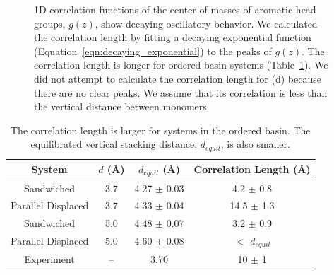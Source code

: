 \documentclass[journal=jpcbfk,manuscript=article]{achemso}
\begin{document}
\begin{figure}[!htb]
  \caption{1D correlation functions of the center of masses of aromatic head
	  groups, $g(z)$, show decaying oscillatory behavior. We calculated the
	  correlation length by fitting a decaying exponential function
	  (Equation~\ref{eqn:decaying_exponential}) to the peaks of $g(z)$. The
	  correlation length is longer for ordered basin systems
	  (Table~\ref{table:correlation_length}). We did not attempt to calculate the
	  correlation length for (d) because there are no clear peaks. We assume that its
	  correlation is less than the vertical distance between monomers.}\label{fig:correlation}
  \end{figure}  
  
  \begin{table}[h]
  \centering
  \begin{tabular}{cccc}
  \toprule
  System             & $\mathit{d}$ (\AA) & $\mathit{d}_{equil}$ (\AA) & Correlation Length (\AA) \\
  \midrule
  Sandwiched         & 3.7                &    4.27 $\pm$ 0.03         & 4.2 $\pm$ 0.8            \\
  Parallel Displaced & 3.7                &    4.33 $\pm$ 0.04         & 14.5 $\pm$ 1.3           \\ 
  Sandwiched         & 5.0                &    4.48 $\pm$ 0.07         & 3.2 $\pm$ 0.9            \\
  Parallel Displaced & 5.0                &    4.60 $\pm$ 0.08         & $<$ $d_{equil}$ \\ 
  Experiment         & --                 &    3.70                    & 10 $\pm$ 1               \\
  \bottomrule
  \end{tabular}
  \caption{The correlation length is larger for systems in the ordered basin. The equilibrated vertical
  stacking distance, $\mathit{d}_{equil}$, is also smaller.}
  \label{table:correlation_length}
  \end{table}
\end{document}
